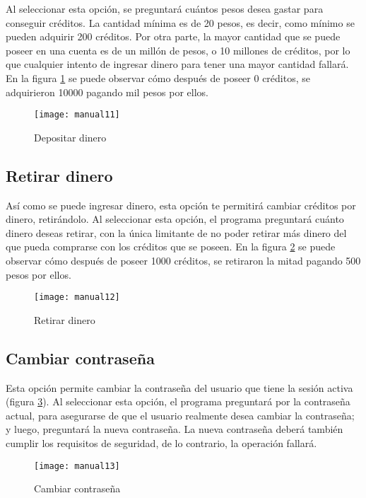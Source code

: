 \documentclass[titlepage,letterpaper,12pt]{article}
\begin{document}
Al seleccionar esta opción, se preguntará cuántos pesos desea gastar para conseguir créditos. La cantidad mínima es de 20 pesos, es decir, como mínimo se pueden adquirir 200 créditos. Por otra parte, la mayor cantidad que se puede poseer en una cuenta es de un millón de pesos, o 10 millones de créditos, por lo que cualquier intento de ingresar dinero para tener una mayor cantidad fallará. En la figura \ref{fig:m11} se puede observar cómo después de poseer 0 créditos, se adquirieron 10000 pagando mil pesos por ellos.
\begin{figure}
  \centering
  \texttt{[image: manual11]}
  \vspace{-1.5cm}
  \caption{Depositar dinero}
  \label{fig:m11}
\end{figure}

\subsection{Retirar dinero}
Así como se puede ingresar dinero, esta opción te permitirá cambiar créditos por dinero, retirándolo. Al seleccionar esta opción, el programa preguntará cuánto dinero deseas retirar, con la única limitante de no poder retirar más dinero del que pueda comprarse con los créditos que se poseen. En la figura \ref{fig:m12} se puede observar cómo después de poseer 1000 créditos, se retiraron la mitad pagando 500 pesos por ellos.
\begin{figure}
  \centering
  \texttt{[image: manual12]}
  \vspace{-1.5cm}
  \caption{Retirar dinero}
  \label{fig:m12}
\end{figure}

\subsection{Cambiar contraseña}
\label{contra}
Esta opción permite cambiar la contraseña del usuario que tiene la sesión activa (figura \ref{fig:m13}). Al seleccionar esta opción, el programa preguntará por la contraseña actual, para asegurarse de que el usuario realmente desea cambiar la contraseña; y luego, preguntará la nueva contraseña. La nueva contraseña deberá también cumplir los requisitos de seguridad, de lo contrario, la operación fallará.
\begin{figure}
  \centering
  \texttt{[image: manual13]}
  \vspace{-1.5cm}
  \caption{Cambiar contraseña}
  \label{fig:m13}
\end{figure}
\end{document}
